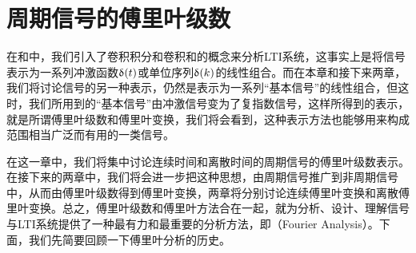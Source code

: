 \chapter{周期信号的傅里叶级数}
在和中，我们引入了卷积积分和卷积和的概念来分析LTI系统，这事实上是将信号表示为一系列冲激函数$\updelta(t)$或单位序列$\updelta(k)$的线性组合。而在本章和接下来两章，我们将讨论信号的另一种表示，仍然是表示为一系列“基本信号”的线性组合，但这时，我们所用到的“基本信号”由冲激信号变为了复指数信号，这样所得到的表示，就是所谓傅里叶级数和傅里叶变换，我们将会看到，这种表示方法也能够用来构成范围相当广泛而有用的一类信号。

在这一章中，我们将集中讨论连续时间和离散时间的周期信号的傅里叶级数表示。在接下来的两章中，我们将会进一步把这种思想，由周期信号推广到非周期信号中，从而由傅里叶级数得到傅里叶变换，两章将分别讨论连续傅里叶变换和离散傅里叶变换。总之，傅里叶级数和傅里叶方法合在一起，就为分析、设计、理解信号与LTI系统提供了一种最有力和最重要的分析方法，即（Fourier Analysis）。下面，我们先简要回顾一下傅里叶分析的历史。







